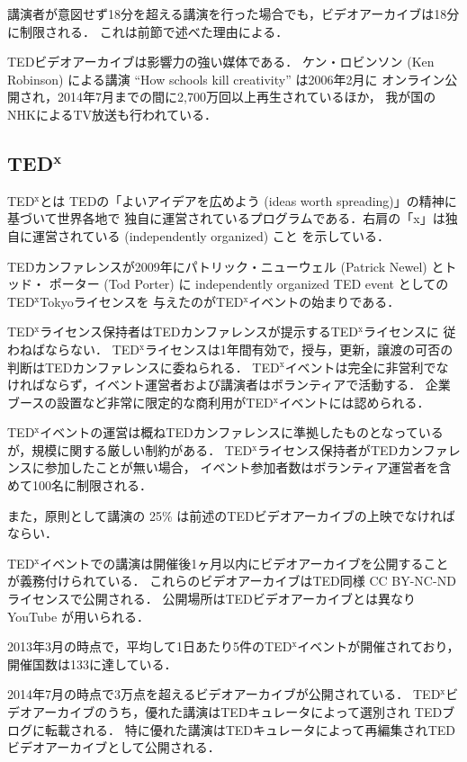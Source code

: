 \documentclass[submit,techreq,jkeyword,noauthor]{ipsj}
\newcommand{\TED}{\textrm{TED}}
\newcommand{\TEDx}{\TED${}^{\textrm{x}}$}
\newcommand{\TEDxTokyo}{\TEDx\textrm{Tokyo}}
\newcommand{\TEDtitle}{\textbf{TED}}
\newcommand{\TEDxtitle}{\TEDtitle${}^{\textbf{x}}$}
\begin{document}
講演者が意図せず18分を超える講演を行った場合でも，ビデオアーカイブは18分に制限される．
これは前節で述べた理由による．

\TED ビデオアーカイブは影響力の強い媒体である．
ケン・ロビンソン (Ken Robinson) による講演 ``How schools kill creativity'' は2006年2月に
オンライン公開され，2014年7月までの間に2,700万回以上再生されているほか，
我が国のNHKによるTV放送も行われている．\cite{kr}


\subsection{\TEDxtitle}

\TEDx とは \TED の「よいアイデアを広めよう (ideas worth spreading)」の精神に基づいて世界各地で
独自に運営されているプログラムである．右肩の「x」は独自に運営されている (independently organized) こと
を示している．

\TED カンファレンスが2009年にパトリック・ニューウェル (Patrick Newel) とトッド・
ポーター (Tod Porter) に independently organized TED event としての\TEDxTokyo ライセンスを
与えたのが\TEDx イベントの始まりである．

\TEDx ライセンス保持者は\TED カンファレンスが提示する\TEDx ライセンス\cite{tedxrules}に
従わねばならない．
\TEDx ライセンスは1年間有効で，授与，更新，譲渡の可否の判断は\TED カンファレンスに委ねられる．
\TEDx イベントは完全に非営利でなければならず，イベント運営者および講演者はボランティアで活動する．
企業ブースの設置など非常に限定的な商利用が\TEDx イベントには認められる．

\TEDx イベントの運営は概ね\TED カンファレンスに準拠したものとなっているが，規模に関する厳しい制約がある．
\TEDx ライセンス保持者が\TED カンファレンスに参加したことが無い場合，
イベント参加者数はボランティア運営者を含めて100名に制限される．

また，原則として講演の 25\% は前述の\TED ビデオアーカイブの上映でなければならい．

\TEDx イベントでの講演は開催後1ヶ月以内にビデオアーカイブを公開することが義務付けられている．
これらのビデオアーカイブは\TED 同様 CC BY-NC-ND ライセンスで公開される．
公開場所は\TED ビデオアーカイブとは異なり YouTube が用いられる．


2013年3月の時点で，平均して1日あたり5件の\TEDx イベントが開催されており，
開催国数は133に達している．\cite{nh,mf}

2014年7月の時点で3万点を超えるビデオアーカイブが公開されている．
\TEDx ビデオアーカイブのうち，優れた講演は\TED キュレータによって選別され \TED ブログに転載される．
特に優れた講演は\TED キュレータによって再編集され\TED ビデオアーカイブとして公開される．\cite{tedxtalksweb}
\end{document}
